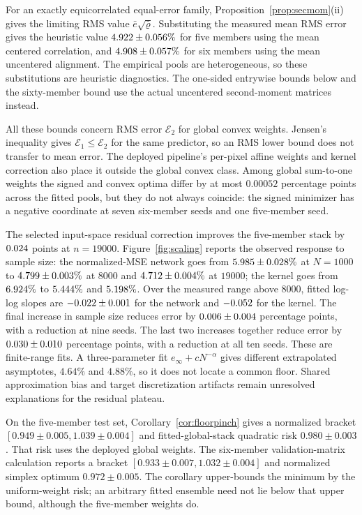 For an exactly equicorrelated equal-error family,
Proposition~\ref{prop:secmom}(ii) gives the limiting RMS value
$\bar e\sqrt{\bar\varrho}$. Substituting the measured mean RMS error gives
the heuristic value $4.922\pm0.056\%$ for five members using
the mean centered correlation, and $4.908\pm0.057\%$
for six members using the mean uncentered alignment. The empirical pools are heterogeneous,
so these substitutions are heuristic diagnostics. The
one-sided entrywise bounds below and the sixty-member bound use the actual
uncentered second-moment matrices instead.

All these bounds concern RMS error $\mathcal E_2$ for global convex weights.
Jensen's inequality gives $\mathcal E_1\le\mathcal E_2$ for the same
predictor, so an RMS lower bound does not transfer to mean error. The deployed
pipeline's per-pixel affine weights and kernel correction also place it
outside the global convex class. Among global sum-to-one weights the signed
and convex optima differ by at most $0.00052$ percentage points across the fitted pools, but they do not always coincide: the signed minimizer has a negative
coordinate at seven six-member seeds and one five-member seed.

The selected input-space residual correction improves the five-member stack
by $0.024$ points at $n=19000$. Figure~\ref{fig:scaling}
reports the observed response to sample size: the normalized-MSE network
goes from $5.985\pm0.028\%$ at $N=1000$ to
$4.799\pm0.003\%$ at $8000$ and
$4.712\pm0.004\%$ at $19000$; the kernel goes from
$6.924\%$ to $5.444\%$ and $5.198\%$.
Over the measured range above $8000$, fitted log-log slopes are
$-0.022\pm0.001$ for the network and $-0.052$ for the
kernel. The final increase in sample size reduces error by
$0.006\pm0.004$ percentage points, with a reduction at
nine seeds. The last two increases together reduce error by
$0.030\pm0.010$ percentage points, with a reduction
at all ten seeds. These are finite-range fits.
A three-parameter fit $e_\infty+cN^{-\alpha}$ gives different extrapolated
asymptotes, $4.64\%$ and $4.88\%$, so it does not locate a common floor.
Shared
approximation bias and target discretization artifacts remain unresolved
explanations for the residual plateau.

On the five-member test set, Corollary~\ref{cor:floorpinch} gives a
normalized bracket $[0.949\pm0.005,1.039\pm0.004]$ and fitted-global-stack
quadratic risk $0.980\pm0.003$. That risk uses the deployed global weights. The six-member validation-matrix
calculation reports a bracket $[0.933\pm0.007,1.032\pm0.004]$ and normalized
simplex optimum $0.972\pm0.005$. The corollary upper-bounds the minimum by
the uniform-weight risk; an arbitrary fitted ensemble need not lie below
that upper bound, although the five-member weights do.

